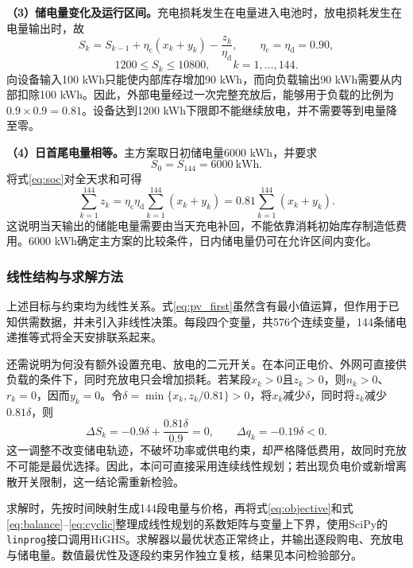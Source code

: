 \textbf{（3）储电量变化及运行区间。}充电损耗发生在电量进入电池时，放电损耗发生在电量输出时，故
\begin{equation}
 S_k=S_{k-1}+\eta_{\mathrm c}(x_k+y_k)-\frac{z_k}{\eta_{\mathrm d}},
 \qquad \eta_{\mathrm c}=\eta_{\mathrm d}=0.90,
 \label{eq:soc}
\end{equation}
\begin{equation}
 1200\leq S_k\leq10800,\qquad k=1,\ldots,144.
 \label{eq:soc_bound}
\end{equation}
向设备输入100 kWh只能使内部库存增加90 kWh，而向负载输出90 kWh需要从内部扣除100 kWh。因此，外部电量经过一次完整充放后，能够用于负载的比例为$0.9\times0.9=0.81$。设备达到1200 kWh下限即不能继续放电，并不需要等到电量降至零。

\textbf{（4）日首尾电量相等。}主方案取日初储电量6000 kWh，并要求
\begin{equation}
 S_0=S_{144}=6000\ \mathrm{kWh}.
 \label{eq:cyclic}
\end{equation}
将式\eqref{eq:soc}对全天求和可得
\begin{equation}
 \sum_{k=1}^{144}z_k=\eta_{\mathrm c}\eta_{\mathrm d}
 \sum_{k=1}^{144}(x_k+y_k)=0.81\sum_{k=1}^{144}(x_k+y_k).
 \label{eq:daily_energy}
\end{equation}
这说明当天输出的储能电量需要由当天充电补回，不能依靠消耗初始库存制造低费用。6000 kWh确定主方案的比较条件，日内储电量仍可在允许区间内变化。

\subsubsection{线性结构与求解方法}
上述目标与约束均为线性关系。式\eqref{eq:pv_first}虽然含有最小值运算，但作用于已知供需数据，并未引入非线性决策。每段四个变量，共576个连续变量，144条储电递推等式将全天安排联系起来。

还需说明为何没有额外设置充电、放电的二元开关。在本问正电价、外网可直接供负载的条件下，同时充放电只会增加损耗。若某段$x_k>0$且$z_k>0$，则$n_k>0$、$r_k=0$，因而$y_k=0$。令$\delta=\min\{x_k,z_k/0.81\}>0$，将$x_k$减少$\delta$，同时将$z_k$减少$0.81\delta$，则
\begin{equation}
 \Delta S_k=-0.9\delta+\frac{0.81\delta}{0.9}=0,
 \qquad \Delta q_k=-0.19\delta<0.
 \label{eq:no_cycle}
\end{equation}
这一调整不改变储电轨迹，不破坏功率或供电约束，却严格降低费用，故同时充放不可能是最优选择。因此，本问可直接采用连续线性规划；若出现负电价或新增离散开关限制，这一结论需重新检验。

求解时，先按时间映射生成144段电量与价格，再将式\eqref{eq:objective}和式\eqref{eq:balance}--\eqref{eq:cyclic}整理成线性规划的系数矩阵与变量上下界，使用SciPy的\texttt{linprog}接口调用HiGHS。求解器以最优状态正常终止，并输出逐段购电、充放电与储电量。数值最优性及逐段约束另作独立复核，结果见本问检验部分。


